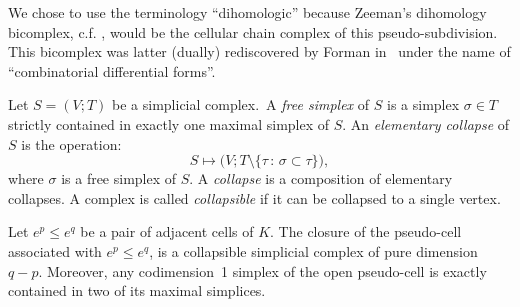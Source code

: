 \documentclass[AHL,Unicode,longabstracts,published]{cedram}
\begin{document}
\begin{rema}
We chose to use the terminology ``dihomologic'' because Zeeman's dihomology bicomplex, c.f. \cite{Zee_dih_i,Zee_dih_ii,Zee_dih_iii}, would be the cellular chain complex of this pseudo-subdivision. This bicomplex was latter (dually) rediscovered by Forman in~\cite{For_comb_nov} under the name of ``combinatorial differential forms''.
\end{rema}

\begin{defi}[Collapse]
Let $S=(V;T)$ be a simplicial complex.~A \emph{free simplex} of $S$ is a simplex $\sigma\in T$ strictly contained in exactly one maximal simplex of $S$. An \emph{elementary collapse} of $S$ is the operation:
\begin{equation*}
S\mapsto \big(V;T\setminus\{\tau\,:\,\sigma\subset \tau\}\big),
\end{equation*}
where $\sigma$ is a free simplex of $S$. A \emph{collapse} is a composition of elementary collapses. A complex is called \emph{collapsible} if it can be collapsed to a single vertex.
\end{defi}

\begin{prop}
Let $e^p\leq e^q$ be a pair of adjacent cells of $K$. The closure of the pseudo-cell associated with $e^p\leq e^q$, is a collapsible simplicial complex of pure dimension $q-p$. Moreover, any codimension~1 simplex of the open pseudo-cell is exactly contained in two of its maximal simplices.
\end{prop}
\end{document}
